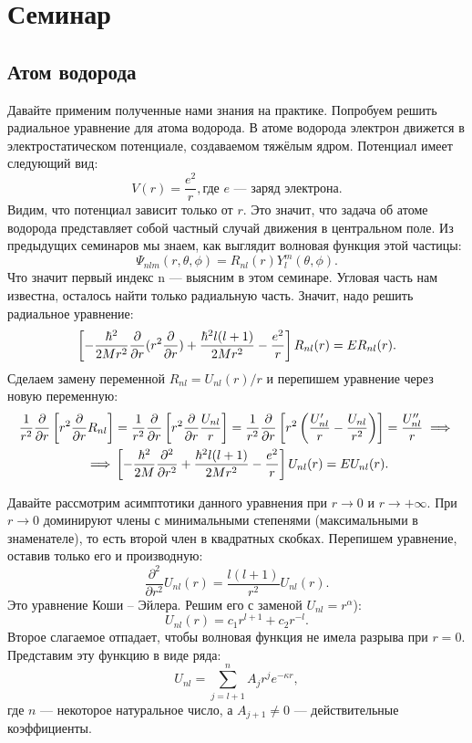 \section{Семинар \thesection}
\subsection{Атом водорода}
Давайте применим полученные нами знания на практике. Попробуем решить
радиальное уравнение для атома водорода. В атоме водорода электрон движется в
электростатическом потенциале, создаваемом тяжёлым ядром. Потенциал имеет
следующий вид:
\[
  V(r) = \frac{e^2}{r}, \text{где $e$ --- заряд электрона}.
\]
Видим, что потенциал зависит только от $r$. Это значит, что задача об атоме
водорода представляет собой частный случай движения в центральном поле. Из
предыдущих семинаров мы знаем, как выглядит волновая функция этой частицы:
\[
  \Psi_{nlm}(r, \theta, \phi) = R_{nl}(r)Y^m_l(\theta, \phi).
\]
Что значит первый индекс n --- выясним в этом семинаре. Угловая часть нам
известна, осталось найти только радиальную часть. Значит, надо решить
радиальное уравнение:
\[
  \left[ -\frac{\hbar^2}{2Mr^2}\frac{\partial }{\partial r}(r^2 \frac{\partial }{\partial r}) + \frac{\hbar^2 l(l+1)}{2Mr^2} - \frac{e^2}{r}\right]R_{nl}(r) = ER_{nl}(r).
\]
Сделаем замену переменной $R_{nl}=U_{nl}(r)/r$ и перепишем уравнение через
новую переменную:
\begin{align*}
  \frac{1}{r^2}\frac{\partial }{\partial r}\left[ r^2 \frac{\partial }{\partial r} R_{nl} \right] &= \frac{1}{r^2}\frac{\partial }{\partial r}\left[ r^2 \frac{\partial }{\partial r} \frac{U_{nl}}{r} \right] = \frac{1}{r^2}\frac{\partial }{\partial r}\left[ r^2 \left(\frac{U'_{nl}}{r} - \frac{U_{nl}}{r^2}\right) \right] = \frac{U''_{nl}}{r} \implies \\
  \implies  &\left[ -\frac{\hbar^2}{2M}\frac{\partial^2}{\partial r^2} + \frac{\hbar^2 l(l+1)}{2Mr^2} - \frac{e^2}{r}\right]U_{nl}(r) = EU_{nl}(r).
\end{align*}

Давайте рассмотрим асимптотики данного уравнения при $r \rightarrow 0$ и $r
  \rightarrow +\infty$. При $r \rightarrow 0$ доминируют члены с минимальными
степенями (максимальными в знаменателе), то есть второй член в квадратных
скобках. Перепишем уравнение, оставив только его и производную:
\[
  \frac{\partial^2}{\partial r^2} U_{nl}(r) = \frac{l(l+1)}{r^2} U_{nl}(r).
\]
Это уравнение Коши -- Эйлера. Решим его с заменой $U_{nl} = r^\alpha$):
\[
  U_{nl}(r) = c_1r^{l+1} + c_2 r^{-l}.
\]
Второе слагаемое отпадает, чтобы волновая функция не имела разрыва при $r = 0$.
Представим эту функцию в виде ряда:
\[
  U_{nl} = \sum\limits_{j=l+1}^{n}A_j r^j e^{-\kappa r},
\]
где $n$ --- некоторое натуральное число, а $A_{j+1} \neq 0$ --- действительные
коэффициенты.

